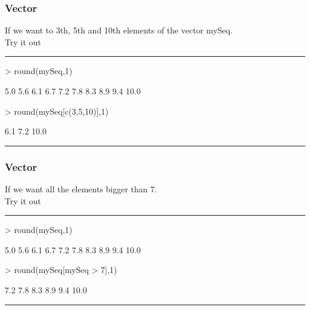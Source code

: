 \documentclass{beamer}
\begin{document}
\begin{frame}[fragile]
	\frametitle{Vector}
	If we want to 3th, 5th and 10th elements of the vector mySeq.\\
	\centering Try it out
	\pause
	\rule{\textwidth}{0.4pt}
\begin{Schunk}
\begin{Sinput}
> round(mySeq,1)
\end{Sinput}
\begin{Soutput}
 [1]  5.0  5.6  6.1  6.7  7.2  7.8  8.3  8.9  9.4 10.0
\end{Soutput}
\begin{Sinput}
> round(mySeq[c(3,5,10)],1)
\end{Sinput}
\begin{Soutput}
[1]  6.1  7.2 10.0
\end{Soutput}
\end{Schunk}
  \rule{\textwidth}{0.4pt}
\end{frame}

\begin{frame}[fragile]
	\frametitle{Vector}
	If we want all the elements bigger than 7.\\
	\centering Try it out\\
	\pause
		\rule{\textwidth}{0.4pt}
\begin{Schunk}
\begin{Sinput}
> round(mySeq,1)
\end{Sinput}
\begin{Soutput}
 [1]  5.0  5.6  6.1  6.7  7.2  7.8  8.3  8.9  9.4 10.0
\end{Soutput}
\begin{Sinput}
> round(mySeq[mySeq > 7],1)
\end{Sinput}
\begin{Soutput}
[1]  7.2  7.8  8.3  8.9  9.4 10.0
\end{Soutput}
\end{Schunk}
  \rule{\textwidth}{0.4pt}
\end{frame}
\end{document}
